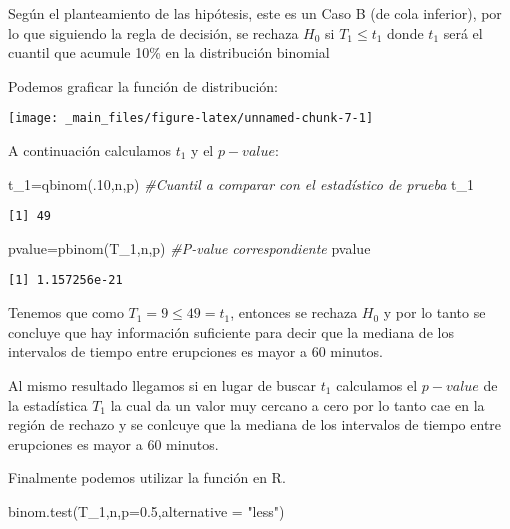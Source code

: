 \documentclass[
  a4paper,
  oneside,
  openany]{book}
\newenvironment{Shaded}{\begin{snugshade}}{\end{snugshade}}
\newcommand{\AttributeTok}[1]{\textcolor[rgb]{0.77,0.63,0.00}{#1}}
\newcommand{\CommentTok}[1]{\textcolor[rgb]{0.56,0.35,0.01}{\textit{#1}}}
\newcommand{\DecValTok}[1]{\textcolor[rgb]{0.00,0.00,0.81}{#1}}
\newcommand{\FloatTok}[1]{\textcolor[rgb]{0.00,0.00,0.81}{#1}}
\newcommand{\FunctionTok}[1]{\textcolor[rgb]{0.00,0.00,0.00}{#1}}
\newcommand{\NormalTok}[1]{#1}
\newcommand{\OtherTok}[1]{\textcolor[rgb]{0.56,0.35,0.01}{#1}}
\newcommand{\StringTok}[1]{\textcolor[rgb]{0.31,0.60,0.02}{#1}}
\begin{document}
Según el planteamiento de las hipótesis, este es un Caso B (de cola inferior), por lo que siguiendo la regla de decisión, se rechaza \(H_0\) si \(T_1\leq t_1\) donde \(t_1\) será el cuantil que acumule 10\% en la distribución binomial

Podemos graficar la función de distribución:

\begin{center}\texttt{[image: \_main\_files/figure-latex/unnamed-chunk-7-1]} \end{center}

A continuación calculamos \(t_1\) y el \(p-value\):

\begin{Shaded}
\begin{Highlighting}[]
\NormalTok{t\_1}\OtherTok{=}\FunctionTok{qbinom}\NormalTok{(.}\DecValTok{10}\NormalTok{,n,p)        }\CommentTok{\#Cuantil a comparar con el estadístico de prueba}
\NormalTok{t\_1}
\end{Highlighting}
\end{Shaded}

\begin{verbatim}
[1] 49
\end{verbatim}

\begin{Shaded}
\begin{Highlighting}[]
\NormalTok{pvalue}\OtherTok{=}\FunctionTok{pbinom}\NormalTok{(T\_1,n,p)     }\CommentTok{\#P{-}value correspondiente}
\NormalTok{pvalue}
\end{Highlighting}
\end{Shaded}

\begin{verbatim}
[1] 1.157256e-21
\end{verbatim}

Tenemos que como \(T_1=9\leq 49 =t_1\), entonces se rechaza \(H_0\) y por lo tanto se concluye que hay información suficiente para decir que la mediana de los intervalos de tiempo entre erupciones es mayor a 60 minutos.

Al mismo resultado llegamos si en lugar de buscar \(t_1\) calculamos el \(p-value\) de la estadística \(T_1\) la cual da un valor muy cercano a cero por lo tanto cae en la región de rechazo y se conlcuye que la mediana de los intervalos de tiempo entre erupciones es mayor a 60 minutos.

Finalmente podemos utilizar la función en R.

\begin{Shaded}
\begin{Highlighting}[]
\FunctionTok{binom.test}\NormalTok{(T\_1,n,}\AttributeTok{p=}\FloatTok{0.5}\NormalTok{,}\AttributeTok{alternative =} \StringTok{"less"}\NormalTok{)}
\end{Highlighting}
\end{Shaded}
\end{document}
